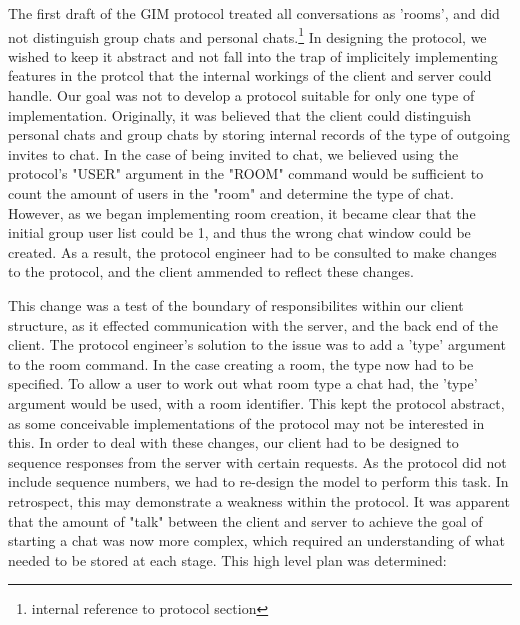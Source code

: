 The first draft of the GIM protocol treated all conversations as 'rooms', and did not distinguish group chats and personal chats.\footnote{internal reference to protocol section} In designing the protocol, we wished to keep it abstract and not fall into the trap of implicitely implementing features in the protcol that the internal workings of the client and server could handle. Our goal was not to develop a protocol suitable for only one type of implementation. Originally, it was believed that the client could distinguish personal chats and group chats by storing internal records of the type of outgoing invites to chat. In the case of being invited to chat, we believed using the protocol's "USER" argument in the "ROOM" command would be sufficient to count the amount of users in the "room" and determine the type of chat. However, as we began implementing room creation, it became clear that the initial group user list could be 1, and thus the wrong chat window could be created. As a result, the protocol engineer had to be consulted to make changes to the protocol, and the client ammended to reflect these changes. 

This change was a test of the boundary of responsibilites within our client structure, as it effected communication with the server, and the back end of the client. The protocol engineer's solution to the issue was to add a 'type' argument to the room command. In the case creating a room, the type now had to be specified. To allow a user to work out what room type a chat had, the 'type' argument would be used, with a room identifier. This kept the protocol abstract, as some conceivable implementations of the protocol may not be interested in this. In order to deal with these changes, our client had to be designed to sequence responses from the server with certain requests. As the protocol did not include sequence numbers, we had to re-design the model to perform this task. In retrospect, this may demonstrate a weakness within the protocol. It was apparent that the amount of "talk" between the client and server to achieve the goal of starting a chat was now more complex, which required an understanding of what needed to be stored at each stage. This high level plan was determined:


